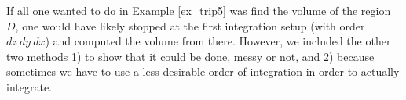 \begin{example}








\end{example}

If all one wanted to do in Example \ref{ex_trip5} was find the volume of the region $D$, one would have likely stopped at the first integration setup (with order $dz\ dy\ dx$) and computed the volume from there. However, we included the other two methods 1) to show that it could be done, messy or not, and 2) because sometimes we have to use a less desirable order of integration in order to actually integrate.




